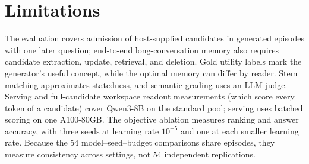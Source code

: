 \section{Limitations}
\label{sec:limitations}

The evaluation covers admission of host-supplied candidates in generated
episodes with one later question; end-to-end long-conversation memory
also requires candidate extraction, update, retrieval, and deletion.
Gold utility labels mark the generator's useful concept, while the
optimal memory can differ by reader. Stem matching approximates
statedness, and semantic grading uses an LLM judge. Serving and
full-candidate workspace readout measurements (which score every token
of a candidate) cover Qwen3-8B on the standard pool; serving uses batched
scoring on one A100-80GB. The objective ablation measures ranking and
answer accuracy, with three seeds at learning rate $10^{-5}$ and one at
each smaller learning rate.
Because the 54 model--seed--budget comparisons share episodes, they
measure consistency across settings, not 54 independent replications.

